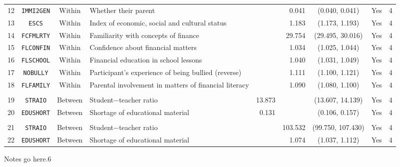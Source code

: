 {\begin{tabular}{ccclrrccc}
      12    & \texttt{IMMI2GEN} & Within & Whether their parent &       & 0.041 & (0.040, 0.041) & Yes   & 4 \\
      13    & \texttt{ESCS}  & Within & Index of economic, social and cultural status &       & 1.183 & (1.173, 1.193) & Yes   & 4 \\
      14    & \texttt{FCFMLRTY} & Within & Familiarity with concepts of finance &       & 29.754 & (29.495, 30.016) & Yes   & 4 \\
      15    & \texttt{FLCONFIN} & Within & Confidence about financial matters &       & 1.034 & (1.025, 1.044) & Yes   & 4 \\
      16    & \texttt{FLSCHOOL} & Within & Financial education in school lessons &       & 1.040 & (1.031, 1.049) & Yes   & 4 \\
      17    & \texttt{NOBULLY} & Within & Participant's experience of being bullied (reverse) &       & 1.111 & (1.100, 1.121) & Yes   & 4 \\
      18    & \texttt{FLFAMILY} & Within & Parental involvement in matters of financial literacy &       & 1.090 & (1.080, 1.100) & Yes   & 4 \\
            &       &       &       &       &       &       &       &  \\
      19    & \texttt{STRAIO} & Between & Student$-$teacher ratio & 13.873 &       & (13.607, 14.139) & Yes   & 4 \\
      20    & \texttt{EDUSHORT} & Between & Shortage of educational material & 0.131 &       & (0.106, 0.157) & Yes   & 4 \\
            &       &       &       &       &       &       &       &  \\
      21    & \texttt{STRAIO} & Between & Student$-$teacher ratio &       & 103.532 & (99.750, 107.430) & Yes   & 4 \\
      22    & \texttt{EDUSHORT} & Between & Shortage of educational material &       & 1.074 & (1.037, 1.112) & Yes   & 4 \\
\bottomrule
      \end{tabular}
}{Notes go here.}{6}